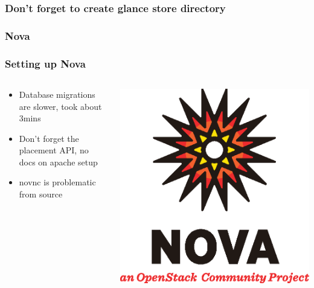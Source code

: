 \documentclass[aspectratio=169,11pt,hyperref={colorlinks=true}]{beamer}
\begin{document}
\begin{frame}
    \frametitle{Don't forget to create glance store directory}
    
\end{frame}

\subsubsection{Nova}
\begin{frame}
    \frametitle{Setting up Nova}
    \begin{columns}[T]
        \begin{column}{.48\textwidth}
            \begin{itemize}
                \item Database migrations are slower, took about 3mins
                \item Don't forget the placement API, no docs on apache setup
                \item novnc is problematic from source
            \end{itemize}
        \end{column}
        \begin{column}{.48\textwidth}
            \includegraphics[width=\textwidth]{mascots/nova.eps}
        \end{column}
    \end{columns}
\end{frame}
\end{document}
